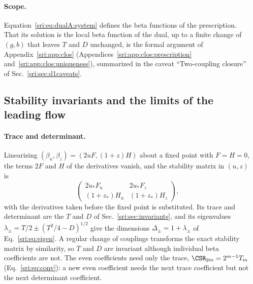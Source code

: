 \paragraph{Scope.} Equation~\eqref{sri:eq:dualA:system} defines the beta functions of the prescription. That its
solution is the local beta function of the dual, up to a finite change of $(g,b)$ that leaves $T$ and $D$ unchanged,
is the formal argument of Appendix~\ref{sri:app:clos} (Appendices~\ref{sri:app:clos:prescription} and~\ref{sri:app:clos:uniqueness}), summarized in the caveat ``Two-coupling
closure'' of Sec.~\ref{sri:sec:d1caveats}.

\subsection{Stability invariants and the limits of the leading flow}\label{sri:app:dualA:invariants}
\paragraph{Trace and determinant.} Linearizing $(\beta_u,\beta_z)=(2uF,(1+z)H)$ about a fixed point with $F=H=0$,
the terms $2F$ and $H$ of the derivatives vanish, and the stability matrix in $(u,z)$ is
\begin{equation}
 \begin{pmatrix} 2u_*F_u & 2u_*F_z\\ (1+z_*)H_u & (1+z_*)H_z\end{pmatrix},
 \label{sri:eq:dualA:stability}
\end{equation}
with the derivatives taken before the fixed point is substituted. Its trace and determinant are the $T$ and $D$ of
Sec.~\ref{sri:sec:invariants}, and its eigenvalues $\lambda_\pm=T/2\pm(T^2/4-D)^{1/2}$ give the dimensions
$\Delta_\pm=1+\lambda_\pm$ of Eq.~\eqref{sri:eq:eigen}. A regular change of couplings transforms the exact stability
matrix by similarity, so $T$ and $D$ are invariant although individual beta coefficients are not. The even
coefficients need only the trace, $\CSR_{2m}=2^{m-1}T_m$ (Eq.~\eqref{sri:eq:conv}): a new even coefficient needs the next
trace coefficient but not the next determinant coefficient.

